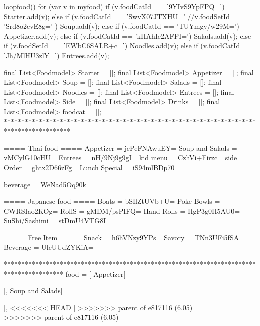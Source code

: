                     loopfood() {
                        for (var v in myfood) {
                          if (v.foodCatId == '9YIvS9YpFPQ=') {
                            Starter.add(v);
                          } else if (v.foodCatId == 'SwvX07JTXHU=' //v.foodSetId == 'Srd8o2evE8g='
                              ) {
                            Soup.add(v);
                          } else if (v.foodCatId == 'TUYmgy/w29M=') {
                            Appetizer.add(v);
                          } else if (v.foodCatId == 'kHAhIe2AFPI=') {
                            Salads.add(v);
                          } else if (v.foodSetId == 'EWbC6SALR+c=') {
                            Noodles.add(v);
                          } else if (v.foodCatId == 'Jh/MlHU3zlY=') {
                            Entrees.add(v);
                          }
                        }
                      }

                      final List<Foodmodel> Starter = [];
                      final List<Foodmodel> Appetizer = [];
                      final List<Foodmodel> Soup = [];
                      final List<Foodmodel> Salads = [];
                      final List<Foodmodel> Noodles = [];
                      final List<Foodmodel> Entrees = [];
                      final List<Foodmodel> Side = [];
                      final List<Foodmodel> Drinks = [];
                      final List<Foodmodel> foodcat = [];
*******************************************************************************************

==== Thai food ====
Appetizer = jePeFNAwuEY=
Soup and Salads = vMCylG10cHU=
Entrees = nH/9Nj9g9gI=
kid menu = CzhVi+Firzc=
side Order = ghtx2D66zFg=
Lunch Special = iS94mlBDp70=


beverage = WeNad5Oq90k=


==== Japanese food ====
Boats = bSIlZtUVb+U=
Poke Bowls = CWRSIao2KOg=
RollS = gMDM/psPIFQ=
Hand Rolls = HgP3g0H5AU0=
SuShi/Sashimi = stDmU4VTG8I=

==== Free Item ====
Snack = h6hVNzy9YPs=
Savory = TNn3UFi5fSA=
Beverage = UleUUdZYKiA=


*****************************************************************************************
food = [
    Appetizer[

    ],
    Soup and Salads[

    ],
<<<<<<< HEAD
]
>>>>>>> parent of e817116 (6.05)
=======
]
>>>>>>> parent of e817116 (6.05)
